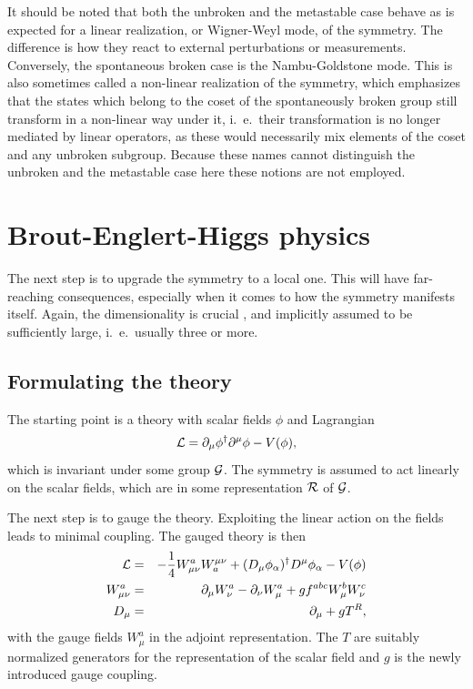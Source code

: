 \documentclass[final,12pt]{article}
\newcommand*{\La}{{\cal{L}}}
\newcommand*{\no}{\noindent}
\newcommand*{\bea}{\begin{eqnarray}}
\newcommand*{\eea}{\end{eqnarray}}
\newcommand*{\be}{\begin{equation}}
\newcommand*{\ee}{\end{equation}}
\newcommand*{\pd}{\partial}
\newcommand*{\pdm}{\pd_{\mu}}
\newcommand*{\pdn}{\pd_{\nu}}
\newcommand*{\mn}{{\mu\nu}}
\newcommand*{\nn}{\nonumber}
\newcommand*{\1}{1\!\!\!\bot}
\begin{document}
It should be noted that both the unbroken and the metastable case behave as is expected for a linear realization, or Wigner-Weyl mode, of the symmetry. The difference is how they react to external perturbations or measurements. Conversely, the spontaneous broken case is the Nambu-Goldstone mode. This is also sometimes called a non-linear realization of the symmetry, which emphasizes that the states which belong to the coset of the spontaneously broken group still transform in a non-linear way under it, i.\ e.\ their transformation is no longer mediated by linear operators, as these would necessarily mix elements of the coset and any unbroken subgroup. Because these names cannot distinguish the unbroken and the metastable case here these notions are not employed.

\section{Brout-Englert-Higgs physics}\label{s:beh}

The next step is to upgrade the symmetry to a local one. This will have far-reaching consequences, especially when it comes to how the symmetry manifests itself. Again, the dimensionality is crucial \cite{Kennedy:1985yn,Kennedy:1986ut}, and implicitly assumed to be sufficiently large, i.\ e.\ usually three or more.

\subsection{Formulating the theory}\label{s:local}

The starting point is a theory with scalar fields $\phi$ and Lagrangian
\be
\La=\pdm\phi^\dagger\pd^\mu\phi-V(\phi)\nn,
\ee
\no which is invariant under some group ${\cal G}$. The symmetry is assumed to act linearly on the scalar fields, which are in some representation ${\cal R}$ of ${\cal G}$.

The next step is to gauge the theory. Exploiting the linear action on the fields leads to minimal coupling. The gauged theory is then
\bea
{\La}&=&-\frac{1}{4}W_\mn^aW^\mn_a+(D_\mu\phi_\alpha)^\dagger D^\mu\phi_\alpha-V(\phi)\label{la:hs}\\
W_\mn^a&=&\pdm W_\nu^a-\pdn W_\mu^a+gf^{abc}W_\mu^b W_\nu^c\nn\\
D_\mu&=&\pdm+gT^R\nn,
\eea
\no with the gauge fields $W_\mu^a$ in the adjoint representation. The $T$ are suitably normalized generators for the representation of the scalar field and $g$ is the newly introduced gauge coupling.
\end{document}
